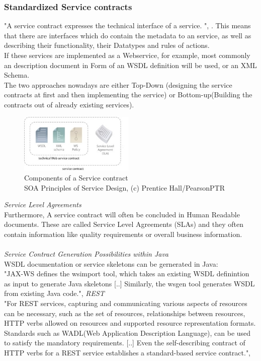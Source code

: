 \documentclass[12pt]{article}
\begin{document}
\subsubsection{Standardized Service contracts}
\label{sec:StandardizedServicecontracts}
"A service contract expresses the technical interface of a service. ", \cite[page 33]{grau}. This means that there are interfaces which do contain the metadata to an service, as well as describing their functionality, their Datatypes and rules of actions. \cite[page 86]{te} \\ If these services are implemented as a Webservice, for example, most commonly an description document in Form of an WSDL definition will be used, or an XML Schema. \\
The two approaches nowadays are either Top-Down (designing the service contracts at first and then implementing the service) or Bottom-up(Building the contracts out of already existing services). \cite[page 151,152]{grau}
\begin{figure}[here!]
	\centering
	\includegraphics[width=0.49\textwidth]{images/soajuhu}
	\caption{Components of a Service contract \cite{photos}\\ SOA Principles of Service Design, (c) Prentice Hall/PearsonPTR }
	\label{fig:servicecontractcomponents}
	\end{figure}
\FloatBarrier
 \noindent\textit{Service Level Agreements} \\
Furthermore, A service contract will often be concluded in Human Readable documents. These are called Service Level Agreements (SLAs) and they often contain information like quality requirements or overall business information. 
\\ \\
\textit{Service Contract Generation Possibilities within Java} \\
WSDL documentation or service skeletons can be gernerated in Java:\\ 
"JAX-WS defines the wsimport tool, which takes an existing WSDL definintion as input to generate Java skeletons [..] Similarly, the wsgen tool generates WSDL from existing Java code.",\cite[page 151]{grau}
 \noindent\textit{REST}\\
"For REST services, capturing and communicating various aspects of resources can be necessary, such as the set of resources, relationships between resources, HTTP verbs allowed on resources and supported resource representation formats. Standards such as WADL(Web Application Description Language), can be used to satisfy the mandatory requirements. [..] Even the self-describing contract of HTTP verbs for a REST service establishes a standard-based service contract.", \cite[page 151]{grau}
\end{document}
